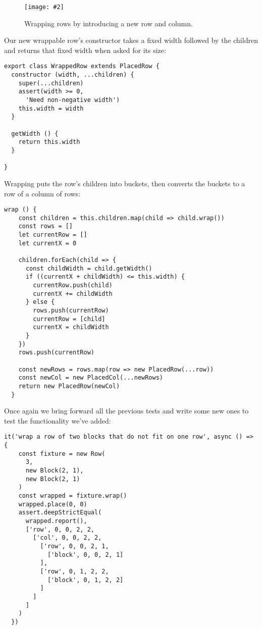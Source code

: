 \documentclass[krantzl]{krantz}
\newcommand{\figpdf}[4]{\begin{figure}%
\centering%
\texttt{[image: \#2]}%
\caption{#3}%
\label{#1}%
\end{figure}}
\begin{document}
\figpdf{layout-engine-wrap}{./layout-engine/wrap.pdf}{Wrapping rows by introducing a new row and column.}{0.6}


Our new wrappable row’s constructor takes a fixed width followed by the children
and returns that fixed width when asked for its size:


\begin{lstlisting}[frame=tblr]
export class WrappedRow extends PlacedRow {
  constructor (width, ...children) {
    super(...children)
    assert(width >= 0,
      'Need non-negative width')
    this.width = width
  }

  getWidth () {
    return this.width
  }

}
\end{lstlisting}



\noindent Wrapping puts the row’s children into buckets,
then converts the buckets to a row of a column of rows:


\begin{lstlisting}[frame=tblr]
  wrap () {
    const children = this.children.map(child => child.wrap())
    const rows = []
    let currentRow = []
    let currentX = 0

    children.forEach(child => {
      const childWidth = child.getWidth()
      if ((currentX + childWidth) <= this.width) {
        currentRow.push(child)
        currentX += childWidth
      } else {
        rows.push(currentRow)
        currentRow = [child]
        currentX = childWidth
      }
    })
    rows.push(currentRow)

    const newRows = rows.map(row => new PlacedRow(...row))
    const newCol = new PlacedCol(...newRows)
    return new PlacedRow(newCol)
  }
\end{lstlisting}



Once again we bring forward all the previous tests
and write some new ones to test the functionality we’ve added:


\begin{lstlisting}[frame=tblr]
  it('wrap a row of two blocks that do not fit on one row', async () => {
    const fixture = new Row(
      3,
      new Block(2, 1),
      new Block(2, 1)
    )
    const wrapped = fixture.wrap()
    wrapped.place(0, 0)
    assert.deepStrictEqual(
      wrapped.report(),
      ['row', 0, 0, 2, 2,
        ['col', 0, 0, 2, 2,
          ['row', 0, 0, 2, 1,
            ['block', 0, 0, 2, 1]
          ],
          ['row', 0, 1, 2, 2,
            ['block', 0, 1, 2, 2]
          ]
        ]
      ]
    )
  })
\end{lstlisting}
\end{document}
